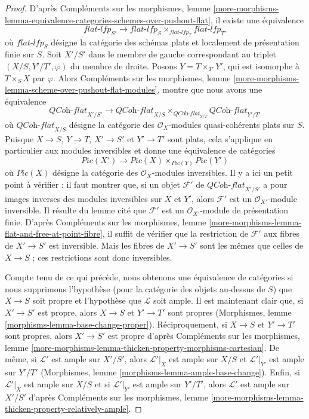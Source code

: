 \begin{proof}
D'après Compléments sur les morphismes, lemme
\ref{more-morphisms-lemma-equivalence-categories-schemes-over-pushout-flat},
il existe une équivalence
$$
\textit{flat-lfp}_{S'}
\longrightarrow
\textit{flat-lfp}_S \times_{\textit{flat-lfp}_T} \textit{flat-lfp}_{T'}
$$
où $\textit{flat-lfp}_S$ désigne la catégorie des schémas plats et localement
de présentation finie sur $S$.
Soit $X'/S'$ dans le membre de gauche correspondant au triplet
$(X/S, Y'/T', \varphi)$ du membre de droite.
Posons $Y = T \times_{T'} Y'$, qui est isomorphe à $T \times_S X$ par
$\varphi$. Alors Compléments sur les morphismes, lemme
\ref{more-morphisms-lemma-scheme-over-pushout-flat-modules}, montre que nous
avons une équivalence
$$
\textit{QCoh-flat}_{X'/S'}
\longrightarrow
\textit{QCoh-flat}_{X/S}
\times_{\textit{QCoh-flat}_{Y/T}} \textit{QCoh-flat}_{Y'/T'}
$$
où $\textit{QCoh-flat}_{X/S}$ désigne la catégorie des
$\mathcal{O}_X$-modules quasi-cohérents plats sur $S$.
Puisque $X \to S$, $Y \to T$, $X' \to S'$ et $Y' \to T'$ sont plats, cela
s'applique en particulier aux modules inversibles et donne une équivalence de
catégories
$$
\textit{Pic}(X')
\longrightarrow
\textit{Pic}(X) \times_{\textit{Pic}(Y)} \textit{Pic}(Y')
$$
où $\textit{Pic}(X)$ désigne la catégorie des $\mathcal{O}_X$-modules
inversibles. Il y a ici un petit point à vérifier : il faut montrer que, si un
objet $\mathcal{F}'$ de $\textit{QCoh-flat}_{X'/S'}$ a pour images inverses des
modules inversibles sur $X$ et $Y'$, alors $\mathcal{F}'$ est un
$\mathcal{O}_{X'}$-module inversible.
Il résulte du lemme cité que $\mathcal{F}'$ est un
$\mathcal{O}_{X'}$-module de présentation finie.
D'après Compléments sur les morphismes, lemme
\ref{more-morphisms-lemma-flat-and-free-at-point-fibre}, il suffit de vérifier
que la restriction de $\mathcal{F}'$ aux fibres de $X' \to S'$ est inversible.
Mais les fibres de $X' \to S'$ sont les mêmes que celles de $X \to S$ ; ces
restrictions sont donc inversibles.

\medskip\noindent
Compte tenu de ce qui précède, nous obtenons une équivalence de catégories si
nous supprimons l'hypothèse (pour la catégorie des objets au-dessus de $S$) que
$X \to S$ soit propre et l'hypothèse que $\mathcal{L}$ soit ample.
Il est maintenant clair que, si $X' \to S'$ est propre, alors
$X \to S$ et $Y' \to T'$ sont propres (Morphismes, lemme
\ref{morphisms-lemma-base-change-proper}).
Réciproquement, si $X \to S$ et $Y' \to T'$ sont propres, alors
$X' \to S'$ est propre d'après
Compléments sur les morphismes, lemme
\ref{more-morphisms-lemma-thicken-property-morphisms-cartesian}.
De même, si $\mathcal{L}'$ est ample sur $X'/S'$, alors
$\mathcal{L}'|_X$ est ample sur $X/S$ et
$\mathcal{L}'|_{Y'}$ est ample sur $Y'/T'$
(Morphismes, lemme \ref{morphisms-lemma-ample-base-change}).
Enfin, si $\mathcal{L}'|_X$ est ample sur $X/S$ et si
$\mathcal{L}'|_{Y'}$ est ample sur $Y'/T'$, alors
$\mathcal{L}'$ est ample sur $X'/S'$ d'après
Compléments sur les morphismes, lemme
\ref{more-morphisms-lemma-thicken-property-relatively-ample}.
\end{proof}

